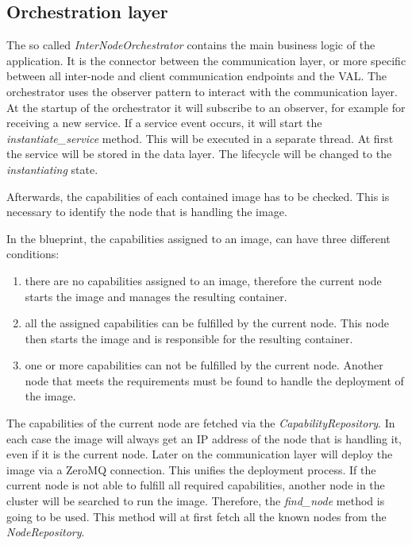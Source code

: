 \subsection{Orchestration layer}
The so called \textit{InterNodeOrchestrator} contains the main business logic of the application.
It is the connector between the communication layer, or more specific between all inter-node and client communication endpoints and the \ac{VAL}.
The orchestrator uses the observer pattern to interact with the communication layer.
At the startup of the orchestrator it will subscribe to an observer, for example for receiving a new service.
If a service event occurs, it will start the \textit{instantiate\_service} method.
This will be executed in a separate thread.
At first the service will be stored in the data layer.
The lifecycle will be changed to the \textit{instantiating} state.\newline

Afterwards, the capabilities of each contained image has to be checked.
This is necessary to identify the node that is handling the image.\newline

In the blueprint, the capabilities assigned to an image, can have three different conditions:\newline
\begin{enumerate}
  \item there are no capabilities assigned to an image, therefore the current node starts the image and manages the resulting container.
  \item all the assigned capabilities can be fulfilled by the current node. This node then starts the image and is responsible for the resulting container.
  \item one or more capabilities can not be fulfilled by the current node. Another node that meets the requirements must be found to handle the deployment of the image.
\end{enumerate}
\bigskip

The capabilities of the current node are fetched via the \textit{CapabilityRepository}.
In each case the image will always get an \ac{IP} address of the node that is handling it, even if it is the current node.
Later on the communication layer will deploy the image via a ZeroMQ connection.
This unifies the deployment process.
If the current node is not able to fulfill all required capabilities, another node in the cluster will be searched to run the image.
Therefore, the \textit{find\_node} method is going to be used.
This method will at first fetch all the known nodes from the \textit{NodeRepository}.\newline

